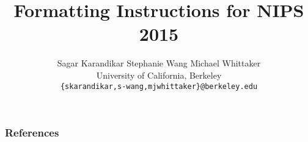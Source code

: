 \documentclass{article}
\title{Formatting Instructions for NIPS 2015}
\author{%
  Sagar Karandikar \qquad Stephanie Wang \qquad Michael Whittaker \\
  University of California, Berkeley\\
  \texttt{\{skarandikar,s-wang,mjwhittaker\}@berkeley.edu} \\
}
\begin{document}
\maketitle

{}
{}
{}
{}
{}
{}
{}

\subsubsection*{References}


\end{document}
